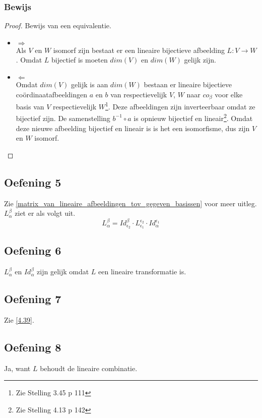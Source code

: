 \documentclass[lineaire_algebra_oplossingen.tex]{subfiles}
\begin{document}
\subsubsection*{Bewijs}
\begin{proof}
Bewijs van een equivalentie.
\begin{itemize}
\item $\Rightarrow$\\
Als $V$ en $W$ isomorf zijn bestaat er een lineaire bijectieve afbeelding $L:V\rightarrow W$. Omdat $L$ bijectief is moeten $dim(V)$ en $dim(W)$ gelijk zijn.
\item $\Leftarrow$\\
Omdat $dim(V)$ gelijk is aan $dim(W)$ bestaan er lineaire bijectieve co\"ordinaatafbeeldingen $a$ en $b$ van respectievelijk $V$, $W$ naar $co_\beta$ voor elke basis van $V$ respectievelijk $W$\footnote{Zie Stelling 3.45 p 111}. Deze afbeeldingen zijn inverteerbaar omdat ze bijectief zijn. De samenstelling $b^{-1}\circ a$ is opnieuw bijectief en lineair\footnote{Zie Stelling 4.13 p 142}. Omdat deze nieuwe afbeelding bijectief en lineair is is het een isomorfisme, dus zijn $V$ en $W$ isomorf.
\end{itemize}
\end{proof}

\subsection{Oefening 5}
Zie \ref{matrix_van_lineaire_afbeeldingen_tov_gegeven_basissen} voor meer uitleg.
$L_{\alpha}^\beta$ ziet er als volgt uit.
\[
L_{\alpha}^\beta = Id_{\epsilon_2}^\beta \cdot L_{\epsilon_1}^{\epsilon_2} \cdot Id_{\alpha}^{\epsilon_1}
\]

\subsection{Oefening 6}
$L_{\alpha}^\beta$ en $Id_{\alpha}^\beta$ zijn gelijk omdat $L$ een lineaire transformatie is.

\subsection{Oefening 7}
Zie \ref{4.39}.

\subsection{Oefening 8}
Ja, want $L$ behoudt de lineaire combinatie.
\end{document}
